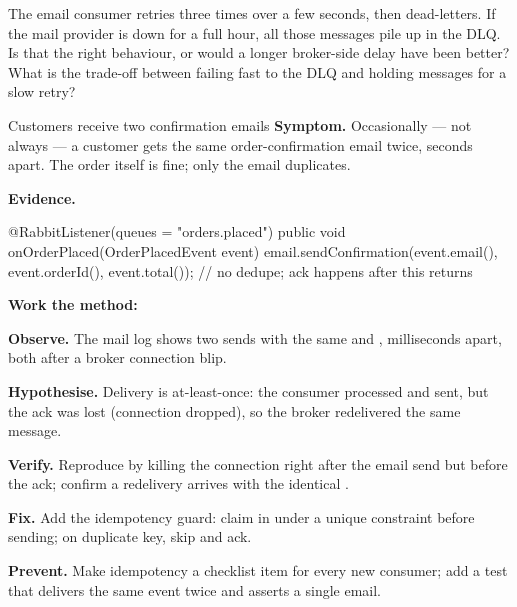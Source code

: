 \begin{thinkbox}
The email consumer retries three times over a few seconds, then dead-letters. If the mail provider is down for a full hour, all those messages pile up in the DLQ. Is that the right behaviour, or would a longer broker-side delay have been better? What is the trade-off between failing fast to the DLQ and holding messages for a slow retry?
\end{thinkbox}


\begin{debuglab}{Customers receive two confirmation emails}
\textbf{Symptom.} Occasionally --- not always --- a customer gets the same order-confirmation email twice, seconds apart. The order itself is fine; only the email duplicates.

\smallskip\textbf{Evidence.}
\begin{javabox}
@RabbitListener(queues = "orders.placed")
public void onOrderPlaced(OrderPlacedEvent event) {
  email.sendConfirmation(event.email(), event.orderId(), event.total());
  // no dedupe; ack happens after this returns
}
\end{javabox}

\textbf{Work the method:}
\begin{tickcheck}
  \item \textbf{Observe.} The mail log shows two sends with the same  and , milliseconds apart, both after a broker connection blip.
  \item \textbf{Hypothesise.} Delivery is at-least-once: the consumer processed and sent, but the ack was lost (connection dropped), so the broker redelivered the same message.
  \item \textbf{Verify.} Reproduce by killing the connection right after the email send but before the ack; confirm a redelivery arrives with the identical .
  \item \textbf{Fix.} Add the idempotency guard: claim  in  under a unique constraint before sending; on duplicate key, skip and ack.
  \item \textbf{Prevent.} Make idempotency a checklist item for every new consumer; add a test that delivers the same event twice and asserts a single email.
\end{tickcheck}
\end{debuglab}

